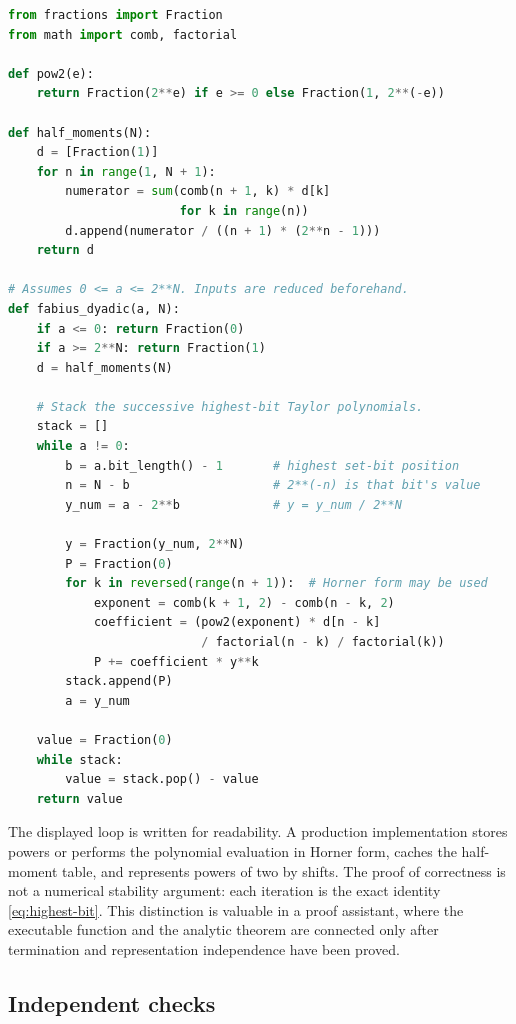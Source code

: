 \documentclass[11pt]{article}
\numberwithin{equation}{section}
\theoremstyle{definition}
\theoremstyle{remark}
\begin{document}
\begin{lstlisting}[language=Python,basicstyle=\ttfamily\small,
  frame=single,caption={Exact inverse-power table and highest-bit evaluation.},
  label={lst:exact-evaluator}]
from fractions import Fraction
from math import comb, factorial

def pow2(e):
    return Fraction(2**e) if e >= 0 else Fraction(1, 2**(-e))

def half_moments(N):
    d = [Fraction(1)]
    for n in range(1, N + 1):
        numerator = sum(comb(n + 1, k) * d[k]
                        for k in range(n))
        d.append(numerator / ((n + 1) * (2**n - 1)))
    return d

# Assumes 0 <= a <= 2**N. Inputs are reduced beforehand.
def fabius_dyadic(a, N):
    if a <= 0: return Fraction(0)
    if a >= 2**N: return Fraction(1)
    d = half_moments(N)

    # Stack the successive highest-bit Taylor polynomials.
    stack = []
    while a != 0:
        b = a.bit_length() - 1       # highest set-bit position
        n = N - b                    # 2**(-n) is that bit's value
        y_num = a - 2**b             # y = y_num / 2**N

        y = Fraction(y_num, 2**N)
        P = Fraction(0)
        for k in reversed(range(n + 1)):  # Horner form may be used
            exponent = comb(k + 1, 2) - comb(n - k, 2)
            coefficient = (pow2(exponent) * d[n - k]
                           / factorial(n - k) / factorial(k))
            P += coefficient * y**k
        stack.append(P)
        a = y_num

    value = Fraction(0)
    while stack:
        value = stack.pop() - value
    return value
\end{lstlisting}

The displayed loop is written for readability.  A production implementation
stores powers or performs the polynomial evaluation in Horner form, caches the
half-moment table, and represents powers of two by shifts.  The proof of
correctness is not a numerical stability argument: each iteration is the
exact identity \eqref{eq:highest-bit}.  This distinction is valuable in a
proof assistant, where the executable function and the analytic theorem are
connected only after termination and representation independence have been
proved.

\subsection{Independent checks}
\end{document}
